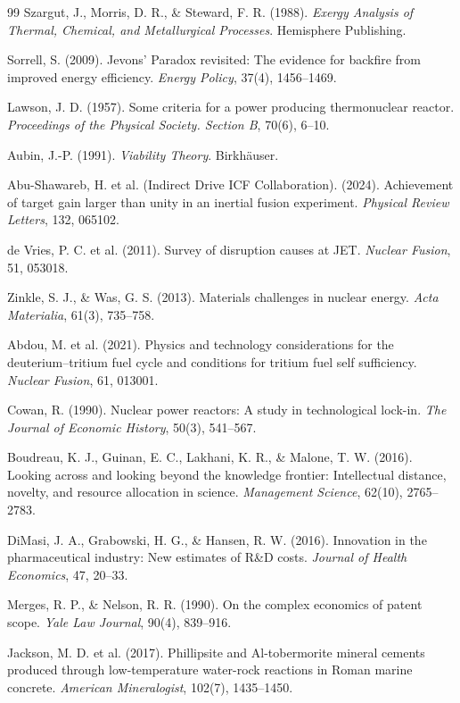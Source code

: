 \documentclass[11pt]{book}
\begin{document}
\begin{thebibliography}{99}
Szargut, J., Morris, D. R., \& Steward, F. R. (1988). \textit{Exergy Analysis of Thermal, Chemical, and Metallurgical Processes}. Hemisphere Publishing.

Sorrell, S. (2009). Jevons' Paradox revisited: The evidence for backfire from improved energy efficiency. \textit{Energy Policy}, 37(4), 1456--1469.

Lawson, J. D. (1957). Some criteria for a power producing thermonuclear reactor. \textit{Proceedings of the Physical Society. Section B}, 70(6), 6--10.

Aubin, J.-P. (1991). \textit{Viability Theory}. Birkhäuser.

Abu-Shawareb, H. et al. (Indirect Drive ICF Collaboration). (2024). Achievement of target gain larger than unity in an inertial fusion experiment. \textit{Physical Review Letters}, 132, 065102.

de Vries, P. C. et al. (2011). Survey of disruption causes at JET. \textit{Nuclear Fusion}, 51, 053018.

Zinkle, S. J., \& Was, G. S. (2013). Materials challenges in nuclear energy. \textit{Acta Materialia}, 61(3), 735--758.

Abdou, M. et al. (2021). Physics and technology considerations for the deuterium--tritium fuel cycle and conditions for tritium fuel self sufficiency. \textit{Nuclear Fusion}, 61, 013001.

Cowan, R. (1990). Nuclear power reactors: A study in technological lock-in. \textit{The Journal of Economic History}, 50(3), 541--567.

Boudreau, K. J., Guinan, E. C., Lakhani, K. R., \& Malone, T. W. (2016). Looking across and looking beyond the knowledge frontier: Intellectual distance, novelty, and resource allocation in science. \textit{Management Science}, 62(10), 2765--2783.

DiMasi, J. A., Grabowski, H. G., \& Hansen, R. W. (2016). Innovation in the pharmaceutical industry: New estimates of R\&D costs. \textit{Journal of Health Economics}, 47, 20--33.

Merges, R. P., \& Nelson, R. R. (1990). On the complex economics of patent scope. \textit{Yale Law Journal}, 90(4), 839--916.

Jackson, M. D. et al. (2017). Phillipsite and Al-tobermorite mineral cements produced through low-temperature water-rock reactions in Roman marine concrete. \textit{American Mineralogist}, 102(7), 1435--1450.


\end{thebibliography}
\end{document}
